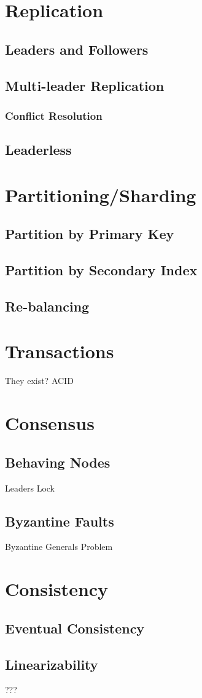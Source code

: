 \section{Replication}
\subsection{Leaders and Followers}

\subsection{Multi-leader Replication}
\subsubsection{Conflict Resolution}

\subsection{Leaderless}

\section{Partitioning/Sharding}

\subsection{Partition by Primary Key}

\subsection{Partition by Secondary Index}

\subsection{Re-balancing}

\section{Transactions}
They exist? ACID

\section{Consensus}

\subsection{Behaving Nodes}
Leaders
Lock

\subsection{Byzantine Faults}
Byzantine Generals Problem

\section{Consistency}

\subsection{Eventual Consistency}

\subsection{Linearizability}

???
